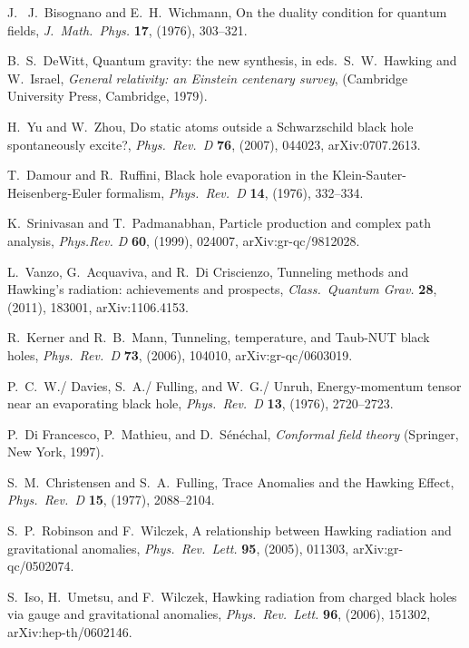 \documentclass[11pt]{article}
\begin{document}
\begin{thebibliography}{999}
 J.~ J.\ Bisognano and E.~H.\ Wichmann, 
On the duality condition for quantum fields, \emph{J.\ Math.\ Phys.}
{\bf 17}, (1976), 303--321.

 B.~S.\ DeWitt, Quantum gravity: the new synthesis,
in eds.\ S.~W.\ Hawking and W.\ Israel, \emph{General relativity: an
Einstein centenary survey}, (Cambridge University Press, Cambridge,
1979).

 H.\ Yu and W.\ Zhou, Do static atoms outside a 
Schwarzschild black hole spontaneously excite?, \emph{Phys.\ Rev.\ D}
{\bf 76}, (2007), 044023, arXiv:0707.2613.

 T.\ Damour and R.\ Ruffini, Black hole evaporation 
in the Klein-Sauter-Heisenberg-Euler formalism, \emph{Phys.\ Rev.\ D}
{\bf 14}, (1976), 332--334.

 K.\ Srinivasan and T.\ Padmanabhan, Particle 
production and complex path analysis, \emph{Phys.Rev. D} {\bf 60}, 
(1999), 024007, arXiv:gr-qc/9812028.

 L.\ Vanzo, G.\ Acquaviva, and R.\ Di Criscienzo,
Tunneling methods and Hawking's radiation: achievements and prospects,
\emph{Class.\ Quantum Grav.} {\bf 28}, (2011), 183001,
arXiv:1106.4153.

 R.\ Kerner and R.~B.\ Mann, Tunneling, temperature, and 
Taub-NUT black holes, \emph{Phys.\ Rev.\ D} {\bf 73}, (2006),
104010, arXiv:gr-qc/0603019.

 P.~C.~W./ Davies, S.~A./ Fulling, and W.~G./ Unruh,
Energy-momentum tensor near an evaporating black hole, \emph{Phys.\
Rev.\ D} {\bf 13}, (1976), 2720--2723.

 P.\ Di Francesco, P.\ Mathieu, and D.\ S{\'e}n{\'e}chal,
 \emph{Conformal field theory} (Springer, New York, 1997).

 S.~M.\ Christensen and S.~A.\ Fulling,
Trace Anomalies and the Hawking Effect, \emph{Phys.\ Rev.\ D}
{\bf 15}, (1977), 2088--2104.

 S.~P.\ Robinson and F.\ Wilczek, A relationship 
between Hawking radiation and gravitational anomalies, \emph{Phys.\ 
Rev.\ Lett.} {\bf 95}, (2005), 011303, arXiv:gr-qc/0502074.

 S.\ Iso, H.\ Umetsu, and F.\ Wilczek, Hawking radiation 
from charged black holes via gauge and gravitational anomalies,
\emph{Phys.\ Rev.\ Lett.} {\bf 96}, (2006), 151302, arXiv:hep-th/0602146.


\end{thebibliography}
\end{document}
